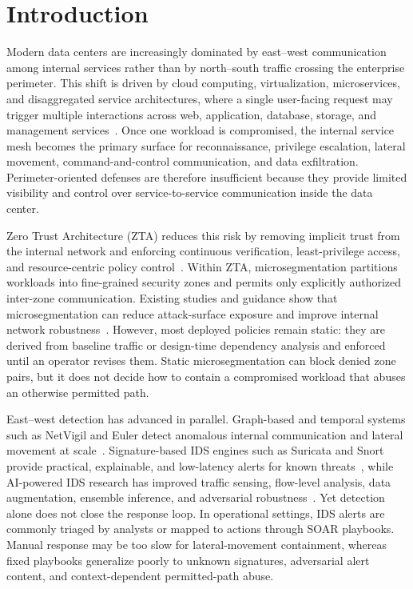 \documentclass[final,5p]{elsarticle}
\begin{document}
\section{Introduction}
\label{sec:introduction}

Modern data centers are increasingly dominated by east--west communication among internal services rather than by north--south traffic crossing the enterprise perimeter. This shift is driven by cloud computing, virtualization, microservices, and disaggregated service architectures, where a single user-facing request may trigger multiple interactions across web, application, database, storage, and management services~\cite{nielsen2017flipping}. Once one workload is compromised, the internal service mesh becomes the primary surface for reconnaissance, privilege escalation, lateral movement, command-and-control communication, and data exfiltration. Perimeter-oriented defenses are therefore insufficient because they provide limited visibility and control over service-to-service communication inside the data center.

Zero Trust Architecture (ZTA) reduces this risk by removing implicit trust from the internal network and enforcing continuous verification, least-privilege access, and resource-centric policy control~\cite{ward2014beyondcorp,rose2020zerotrust}. Within ZTA, microsegmentation partitions workloads into fine-grained security zones and permits only explicitly authorized inter-zone communication. Existing studies and guidance show that microsegmentation can reduce attack-surface exposure and improve internal network robustness~\cite{basta2022towards,buck2021nevertrust,syed2022ztasurvey,chandramouli2023zta207a,chandramouli2020sp800204a}. However, most deployed policies remain static: they are derived from baseline traffic or design-time dependency analysis and enforced until an operator revises them. Static microsegmentation can block denied zone pairs, but it does not decide how to contain a compromised workload that abuses an otherwise permitted path.

East--west detection has advanced in parallel. Graph-based and temporal systems such as NetVigil and Euler detect anomalous internal communication and lateral movement at scale~\cite{netvigil,king2022euler}. Signature-based IDS engines such as Suricata and Snort provide practical, explainable, and low-latency alerts for known threats~\cite{oisf2026suricata}, while AI-powered IDS research has improved traffic sensing, flow-level analysis, data augmentation, ensemble inference, and adversarial robustness~\cite{jAPELID24,jAA-IDS25}. Yet detection alone does not close the response loop. In operational settings, IDS alerts are commonly triaged by analysts or mapped to actions through SOAR playbooks. Manual response may be too slow for lateral-movement containment, whereas fixed playbooks generalize poorly to unknown signatures, adversarial alert content, and context-dependent permitted-path abuse.
\end{document}
